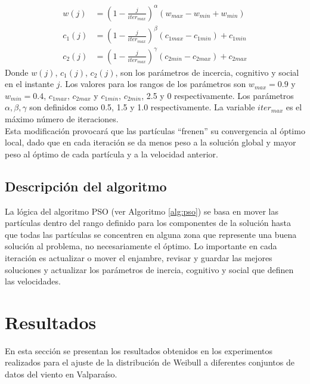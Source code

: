 \begin{align}\label{eq:VariationParameters}
    w(j) &= (1 - \frac{j}{iter_{max}})^{\alpha}(w_{max} - w_{min} + w_{min})\\
    c_{1}(j) &= (1 - \frac{j}{iter_{max}})^{\beta}(c_{1max} - c_{1min}) + c_{1min}\\
    c_{2}(j) &= (1 - \frac{j}{iter_{max}})^{\gamma}(c_{2min} - c_{2max}) + c_{2max}
\end{align}    
Donde $w(j)$, $c_{1}(j)$, $c_{2}(j)$, son los parámetros de incercia, cognitivo y social en el instante $j$. Los valores para los rangos de los parámetros son $w_{max} = 0.9$ y $w_{min} = 0.4$, $c_{1max}$, $c_{2max}$ y $c_{1min}$, $c_{2min}$, 2.5 y 0 respectivamente. Los parámetros $\alpha, \beta, \gamma$ son definidos como 0.5, 1.5 y 1.0 respectivamente. La variable $iter_{max}$ es el máximo número de iteraciones. \\
Esta modificación provocará que las partículas ``frenen'' su convergencia al óptimo local, dado que en cada iteración se da menos peso a la solución global y mayor peso al óptimo de cada partícula y a la velocidad anterior.

\subsection{Descripción del algoritmo}
La lógica del algoritmo PSO (ver Algoritmo \ref{alg:pso}) se basa en mover las partículas dentro del rango definido para los componentes de la solución hasta que todas las partículas se concentren en alguna zona que represente una buena solución al problema, no necesariamente el óptimo. Lo importante en cada iteración es actualizar o mover el enjambre, revisar y guardar las mejores soluciones y actualizar los parámetros de inercia, cognitivo y social que definen las velocidades.



\section{Resultados}\label{sec:Experimentos_velocidad}
En esta sección se presentan los resultados obtenidos en los experimentos realizados para el ajuste de la distribución de Weibull a diferentes conjuntos de datos del viento en Valparaíso.
